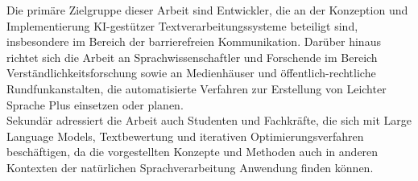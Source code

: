 Die primäre Zielgruppe dieser Arbeit sind Entwickler, die an der Konzeption und Implementierung KI-gestützer Textverarbeitungssysteme beteiligt sind, insbesondere im Bereich der barrierefreien Kommunikation. 
Darüber hinaus richtet sich die Arbeit an Sprachwissenschaftler und Forschende im Bereich Verständlichkeitsforschung sowie an Medienhäuser und öffentlich-rechtliche Rundfunkanstalten, die automatisierte Verfahren zur Erstellung von Leichter Sprache Plus einsetzen oder planen.\\
Sekundär adressiert die Arbeit auch Studenten und Fachkräfte, die sich mit Large Language Models, Textbewertung und iterativen Optimierungsverfahren beschäftigen, da die vorgestellten Konzepte und Methoden auch in anderen Kontexten der natürlichen Sprachverarbeitung Anwendung finden können.